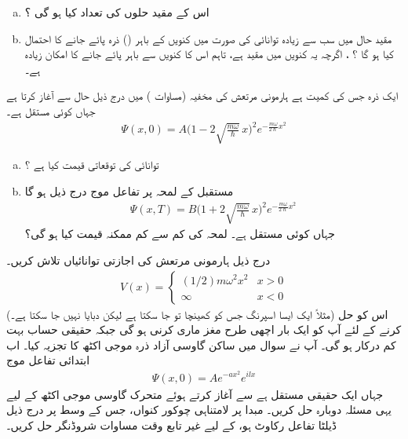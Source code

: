 \begin{enumerate}[a.]
\item
 اس کے مقید حلوں کی تعداد کیا ہو گی ؟
\item 
 مقید حال میں سب سے زیادہ توانائی کی صورت میں کنویں  کے باہر () ذرہ پائے جانے کا احتمال کیا ہو گا ؟
 ، اگرچہ یہ کنویں  میں مقید ہے، تاہم اس کا کنویں  سے باہر پائے جانے کا امکان زیادہ ہے۔ 
\end{enumerate}
ایک ذرہ جس کی کمیت ہے ہارمونی مرتعش کی مخفیہ (مساوات ) میں درج ذیل حال سے آغاز کرتا ہے جہاں کوئی مستقل ہے۔
\begin{align*}
\Psi(x,0)=A\Big(1-2\sqrt{\frac{m\omega}{\hslash}}\, x \Big)^{2}e^{-\frac{m\omega}{2\hslash}x^{2}}
\end{align*}
%
\begin{enumerate}[a.]
\item
 توانائی کی توقعاتی قیمت کیا ہے ؟
\item
مستقبل کے لمحہ  پر تفاعل موج درج ذیل ہو گا
\begin{align*}
\Psi(x,T)=B\Big(1+2\sqrt{\frac{m\omega}{\hslash}}\,x \Big)^{2}e^{-\frac{m\omega}{2\hslash}x^{2}} 
\end{align*}
 جہاں  کوئی مستقل ہے۔ لمحہ  کی کم سے کم ممکنہ قیمت کیا ہو گی؟ 
\end{enumerate}
درج ذیل   ہارمونی مرتعش کی اجازتی توانائیاں تلاش کریں۔
\begin{align*}
V(x)=
\begin{cases}
(1/2)m\omega^{2}x^{2}&x> 0\\
\infty & x< 0
\end{cases}
 \end{align*}
(مثلاً ایک ایسا اسپرنگ جس کو کھینچا تو جا سکتا ہے لیکن دبایا نہیں جا سکتا ہے۔)  اس کو حل کرنے کے لئے آپ کو ایک بار اچھی طرح مغز ماری کرنی  ہو گی جبکہ حقیقی حساب بہت کم درکار ہو گی۔ 
آپ نے سوال  میں ساکن گاوسی آزاد ذرہ موجی اکٹھ کا تجزیہ کیا۔ اب ابتدائی تفاعل موج 
\begin{align*}
\Psi(x,0)=Ae^{-ax^{2}}e^{ilx} 
\end{align*} 
 جہاں ایک حقیقی مستقل ہے سے آغاز کرتے ہوئے متحرک گاوسی موجی اکٹھ کے لیے یہی مسئلہ دوبارہ حل کریں۔
مبدا پر لامتناہی چوکور کنواں، جس کے وسط پر درج ذیل ڈیلٹا تفاعل رکاوٹ ہو، کے لیے غیر تابع وقت مساوات شروڈنگر حل کریں۔
